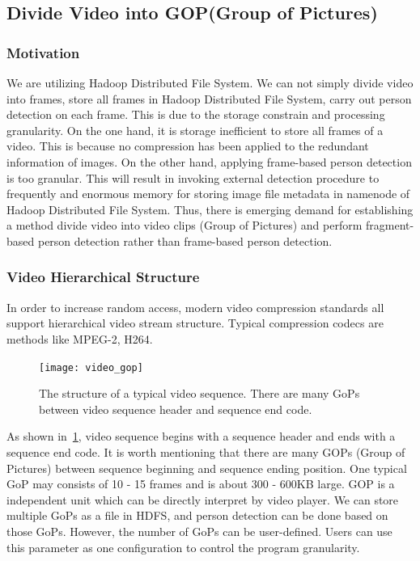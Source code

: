 \subsection{Divide Video into GOP(Group of Pictures)} \label{sec:gop}
\subsubsection{Motivation}
We are utilizing Hadoop Distributed File System. We can not simply divide video
into frames, store all frames in Hadoop Distributed File System, carry out
person detection on each frame. This is due to the storage constrain and
processing granularity. On the one hand, it is storage inefficient to store all 
frames of a video. This is because no compression has been applied to the
redundant information of images. On the other hand, applying frame-based person 
detection is too granular. This will result in invoking external detection
procedure to frequently and enormous memory for storing image file metadata in 
namenode of Hadoop Distributed File System. Thus, there is emerging demand for 
establishing a method divide video into video clips (Group of Pictures) and
perform fragment-based person detection rather than frame-based person detection.

\subsubsection{Video Hierarchical Structure}
In order to increase random access, modern video compression standards all
support hierarchical video stream structure. Typical compression codecs are  
methods like MPEG-2, H264.

\begin{figure}[!htbp]
  \centering
  \begin{minipage}{1.0\columnwidth}
  \texttt{[image: video\_gop]}
  \end{minipage}
  
  \vspace{-1ex}
  \caption
    {
    \small
    The structure of a typical video sequence. There are many GoPs between video
    sequence header and sequence end code.}
  \label{fig:video_gop}
\end{figure}

As shown in~\fig\ref{fig:video_gop}, video sequence begins with a sequence
header and ends with a sequence end code. It is worth mentioning that there are
many GOPs (Group of Pictures) between sequence beginning and sequence ending 
position. One typical GoP may consists of 10 - 15 frames and is about 300 -
600KB large.
GOP is a independent unit which can be directly interpret by video player. We
can store multiple GoPs as a file in HDFS, and person detection can be done
based on those GoPs. However, the number of GoPs can be user-defined. Users can
use this parameter as one configuration to control the program granularity.


